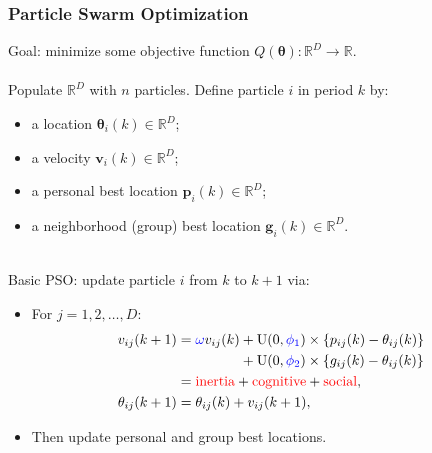 \documentclass[xcolor=dvipsnames]{beamer}
\begin{document}
\begin{frame}
\frametitle{Particle Swarm Optimization}
Goal: minimize some objective function $Q(\bm{\theta}): \mathbb{R}^D \to \mathbb{R}$.\\~\\
Populate $\mathbb{R}^D$ with $n$ particles. Define particle $i$ in period $k$ by:
\begin{itemize}
\item a {\color{red}location} \hfill $\bm{\theta}_i(k)\in \mathbb{R}^D$;\hspace{2.5cm}\phantom{.}
\item a {\color{red}velocity} \hfill $\bm{v}_i(k) \in \mathbb{R}^D$;\hspace{2.5cm}\phantom{.}
\item a {\color{red}personal best} location \hfill $\bm{p}_i(k) \in \mathbb{R}^D$;\hspace{2.5cm}\phantom{.}
\item a {\color{red}neighborhood (group) best} location \hfill $\bm{g}_i(k) \in \mathbb{R}^D$.\hspace{2.5cm}\phantom{.} \\~\\
\end{itemize}

\pause

Basic PSO: update particle $i$ from $k$ to $k+1$ via: \\
\begin{itemize}
\item  For $j=1,2,\dots,D$:
\begin{align*}
v_{ij}(k+1) &= {\color{blue}\omega} v_{ij}(k) +  \mathrm{U}(0,{\color{blue}\phi_1})\times\{p_{ij}(k) - \theta_{ij}(k)\} \\
     &\;\phantom{= \omega v_{ij}(k)}+  \mathrm{U}(0,{\color{blue}\phi_2})\times\{g_{ij}(k) - \theta_{ij}(k)\}\\
& = \mbox{{\color{red}inertia}} + \mbox{{\color{red}cognitive}} + \mbox{{\color{red}social}},\\
\theta_{ij}(k+1) &= \theta_{ij}(k) + v_{ij}(k+1),
\end{align*}
\item Then update personal and group best locations.
\end{itemize}
\end{frame}
\end{document}
